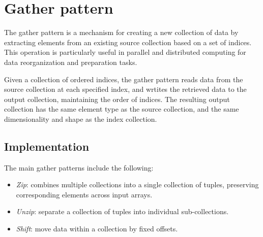 \section{Gather pattern}

The gather pattern is a mechanism for creating a new collection of data by extracting elements from an existing source collection based on a set of indices. 
This operation is particularly useful in parallel and distributed computing for data reorganization and preparation tasks.

Given a collection of ordered indices, the gather pattern reads data from the source collection at each specified index, and wrtites the retrieved data to the output collection, maintaining the order of indices.
The resulting output collection has the same element type as the source collection, and the same dimensionality and shape as the index collection.

\subsection{Implementation}
The main gather patterns include the following:
\begin{itemize}
    \item \textit{Zip}: combines multiple collections into a single collection of tuples, preserving corresponding elements across input arrays. 
    \item \textit{Unzip}: separate a collection of tuples into individual sub-collections.
    \item \textit{Shift}: move data within a collection by fixed offsets. 
\end{itemize}